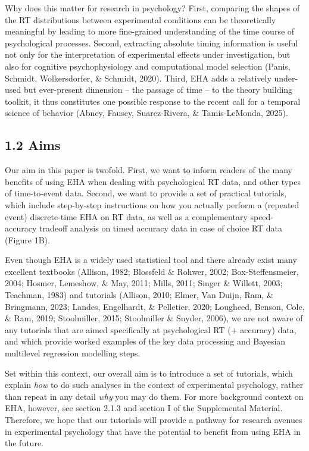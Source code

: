 \documentclass[
  english,
  man, donotrepeattitle,floatsintext]{apa6}
\begin{document}
Why does this matter for research in psychology? First, comparing the shapes of the RT distributions between experimental conditions can be theoretically meaningful by leading to more fine-grained understanding of the time course of psychological processes. Second, extracting absolute timing information is useful not only for the interpretation of experimental effects under investigation, but also for cognitive psychophysiology and computational model selection (Panis, Schmidt, Wolkersdorfer, \& Schmidt, 2020). Third, EHA adds a relatively under-used but ever-present dimension -- the passage of time -- to the theory building toolkit, it thus constitutes one possible response to the recent call for a temporal science of behavior (Abney, Fausey, Suarez-Rivera, \& Tamis-LeMonda, 2025).

\subsection{1.2 Aims}\label{aims}

Our aim in this paper is twofold. First, we want to inform readers of the many benefits of using EHA when dealing with psychological RT data, and other types of time-to-event data. Second, we want to provide a set of practical tutorials, which include step-by-step instructions on how you actually perform a (repeated event) discrete-time EHA on RT data, as well as a complementary speed-accuracy tradeoff analysis on timed accuracy data in case of choice RT data (Figure 1B).

Even though EHA is a widely used statistical tool and there already exist many excellent textbooks (Allison, 1982; Blossfeld \& Rohwer, 2002; Box-Steffensmeier, 2004; Hosmer, Lemeshow, \& May, 2011; Mills, 2011; Singer \& Willett, 2003; Teachman, 1983) and tutorials (Allison, 2010; Elmer, Van Duijn, Ram, \& Bringmann, 2023; Landes, Engelhardt, \& Pelletier, 2020; Lougheed, Benson, Cole, \& Ram, 2019; Stoolmiller, 2015; Stoolmiller \& Snyder, 2006), we are not aware of any tutorials that are aimed specifically at psychological RT (+ accuracy) data, and which provide worked examples of the key data processing and Bayesian multilevel regression modelling steps.

Set within this context, our overall aim is to introduce a set of tutorials, which explain \emph{how} to do such analyses in the context of experimental psychology, rather than repeat in any detail \emph{why} you may do them. For more background context on EHA, however, see section 2.1.3 and section I of the Supplemental Material. Therefore, we hope that our tutorials will provide a pathway for research avenues in experimental psychology that have the potential to benefit from using EHA in the future.
\end{document}
